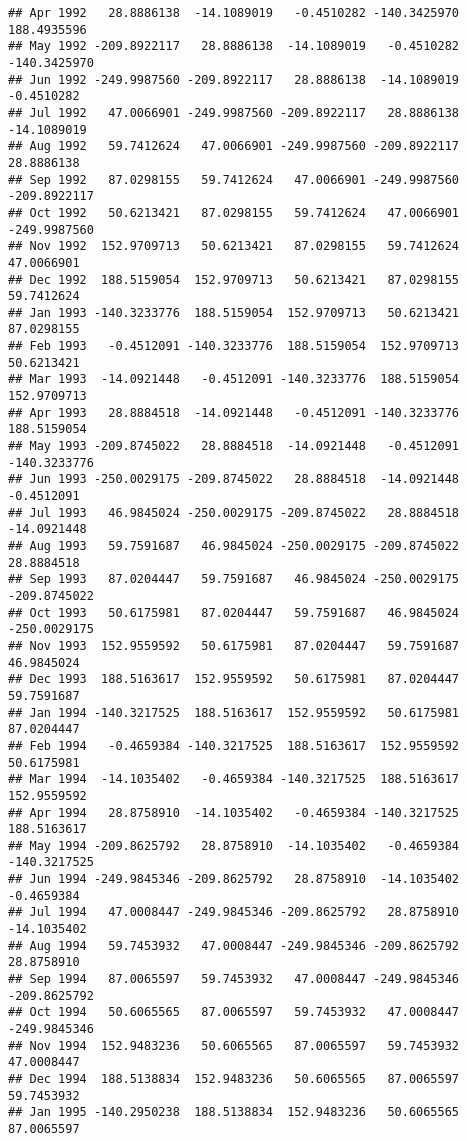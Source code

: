 \documentclass[]{article}
\begin{document}
\begin{verbatim}
## Apr 1992   28.8886138  -14.1089019   -0.4510282 -140.3425970  188.4935596
## May 1992 -209.8922117   28.8886138  -14.1089019   -0.4510282 -140.3425970
## Jun 1992 -249.9987560 -209.8922117   28.8886138  -14.1089019   -0.4510282
## Jul 1992   47.0066901 -249.9987560 -209.8922117   28.8886138  -14.1089019
## Aug 1992   59.7412624   47.0066901 -249.9987560 -209.8922117   28.8886138
## Sep 1992   87.0298155   59.7412624   47.0066901 -249.9987560 -209.8922117
## Oct 1992   50.6213421   87.0298155   59.7412624   47.0066901 -249.9987560
## Nov 1992  152.9709713   50.6213421   87.0298155   59.7412624   47.0066901
## Dec 1992  188.5159054  152.9709713   50.6213421   87.0298155   59.7412624
## Jan 1993 -140.3233776  188.5159054  152.9709713   50.6213421   87.0298155
## Feb 1993   -0.4512091 -140.3233776  188.5159054  152.9709713   50.6213421
## Mar 1993  -14.0921448   -0.4512091 -140.3233776  188.5159054  152.9709713
## Apr 1993   28.8884518  -14.0921448   -0.4512091 -140.3233776  188.5159054
## May 1993 -209.8745022   28.8884518  -14.0921448   -0.4512091 -140.3233776
## Jun 1993 -250.0029175 -209.8745022   28.8884518  -14.0921448   -0.4512091
## Jul 1993   46.9845024 -250.0029175 -209.8745022   28.8884518  -14.0921448
## Aug 1993   59.7591687   46.9845024 -250.0029175 -209.8745022   28.8884518
## Sep 1993   87.0204447   59.7591687   46.9845024 -250.0029175 -209.8745022
## Oct 1993   50.6175981   87.0204447   59.7591687   46.9845024 -250.0029175
## Nov 1993  152.9559592   50.6175981   87.0204447   59.7591687   46.9845024
## Dec 1993  188.5163617  152.9559592   50.6175981   87.0204447   59.7591687
## Jan 1994 -140.3217525  188.5163617  152.9559592   50.6175981   87.0204447
## Feb 1994   -0.4659384 -140.3217525  188.5163617  152.9559592   50.6175981
## Mar 1994  -14.1035402   -0.4659384 -140.3217525  188.5163617  152.9559592
## Apr 1994   28.8758910  -14.1035402   -0.4659384 -140.3217525  188.5163617
## May 1994 -209.8625792   28.8758910  -14.1035402   -0.4659384 -140.3217525
## Jun 1994 -249.9845346 -209.8625792   28.8758910  -14.1035402   -0.4659384
## Jul 1994   47.0008447 -249.9845346 -209.8625792   28.8758910  -14.1035402
## Aug 1994   59.7453932   47.0008447 -249.9845346 -209.8625792   28.8758910
## Sep 1994   87.0065597   59.7453932   47.0008447 -249.9845346 -209.8625792
## Oct 1994   50.6065565   87.0065597   59.7453932   47.0008447 -249.9845346
## Nov 1994  152.9483236   50.6065565   87.0065597   59.7453932   47.0008447
## Dec 1994  188.5138834  152.9483236   50.6065565   87.0065597   59.7453932
## Jan 1995 -140.2950238  188.5138834  152.9483236   50.6065565   87.0065597

\end{verbatim}
\end{document}
